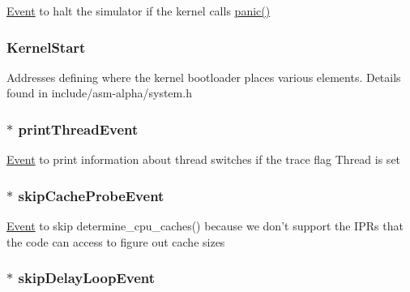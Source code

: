 \label{classLinuxAlphaSystem_aa052aa785f60b08b9c27dfe6838686e4}
\hyperlink{classEvent}{Event} to halt the simulator if the kernel calls \hyperlink{base_2misc_8hh_a1445e207e36c97ff84c54b47288cea19}{panic()} \hypertarget{classLinuxAlphaSystem_a586fffad970b7236ceaab6d5cb3eb9d0}{
\subsubsection[{KernelStart}]{ {\bf KernelStart}}}
\label{classLinuxAlphaSystem_a586fffad970b7236ceaab6d5cb3eb9d0}
Addresses defining where the kernel bootloader places various elements. Details found in include/asm-\/alpha/system.h \hypertarget{classLinuxAlphaSystem_ad433ad9dba393cab0cb0b67f6d3d58ab}{
\subsubsection[{printThreadEvent}]{$\ast$ {\bf printThreadEvent}}}
\label{classLinuxAlphaSystem_ad433ad9dba393cab0cb0b67f6d3d58ab}
\hyperlink{classEvent}{Event} to print information about thread switches if the trace flag Thread is set \hypertarget{classLinuxAlphaSystem_aa2dee1f9674e5ea129c2c31d05ce6412}{
\subsubsection[{skipCacheProbeEvent}]{$\ast$ {\bf skipCacheProbeEvent}}}
\label{classLinuxAlphaSystem_aa2dee1f9674e5ea129c2c31d05ce6412}
\hyperlink{classEvent}{Event} to skip determine\_\-cpu\_\-caches() because we don't support the IPRs that the code can access to figure out cache sizes \hypertarget{classLinuxAlphaSystem_a9cab420f2dc7381c4c07941ff49c8167}{
\subsubsection[{skipDelayLoopEvent}]{$\ast$ {\bf skipDelayLoopEvent}}}
